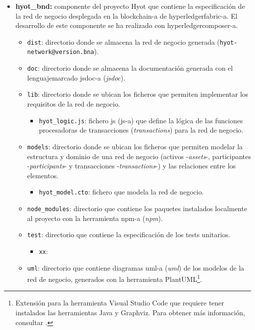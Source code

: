 \documentclass[12pt,a4paper, twoside]{report}
\begin{document}
\begin{itemize}
		\item \textbf{hyot\_bnd:} componente del proyecto Hyot que contiene la especificación de la red de negocio desplegada en la \gls{blockchain-a} de \gls{hyperledgerfabric-a}. El desarrollo de este componente se ha realizado con \gls{hyperledgercomposer-a}.
		\begin{itemize}
			\item \texttt{dist}: directorio donde se almacena la red de negocio generada (\texttt{hyot-network@version.bna}).
			\item \texttt{doc}: directorio donde se almacena la documentación generada con el \gls{lenguajemarcado} \gls{jsdoc-a} (\textit{\gls{jsdoc}}).
			\item \texttt{lib}: directorio donde se ubican los ficheros que permiten implementar los requisitos de la red de negocio.
			\begin{itemize}
				\item \texttt{hyot\_logic.js}: fichero \gls{js} (\gls{js-a}) que define la lógica de las funciones procesadoras de transacciones (\textit{\glspl{transaction}}) para la red de negocio.
			\end{itemize}
			\item \texttt{models}: directorio donde se ubican los ficheros que permiten modelar la estructura y dominio de una red de negocio (activos -\textit{\glspl{asset}}-, participantes -\textit{\glspl{participant}}- y transacciones -\textit{\glspl{transaction}}-) y las relaciones entre los elementos.		
			\begin{itemize}
				\item \texttt{hyot\_model.cto}: fichero que modela la red de negocio.
			\end{itemize}
			\item \texttt{node\_modules}: directorio que contiene los paquetes instalados localmente al proyecto con la herramienta \gls{npm-a} (\textit{\gls{npm}}).	
			\item \texttt{test}: directorio que contiene la especificación de los tests unitarios.
			\begin{itemize}
				\item \texttt{xx}: %
			\end{itemize}
			\item \texttt{uml}: directorio que contiene diagramas \gls{uml-a} (\textit{\gls{uml}}) de los modelos de la red de negocio, generados con la herramienta PlantUML\footnote{Extensión para la herramienta Visual Studio Code que requiere tener instalados las herramientas Java y Graphviz. Para obtener más información, consultar \cite{krishnan:uml}.}.

\end{itemize}
\end{itemize}
\end{document}
